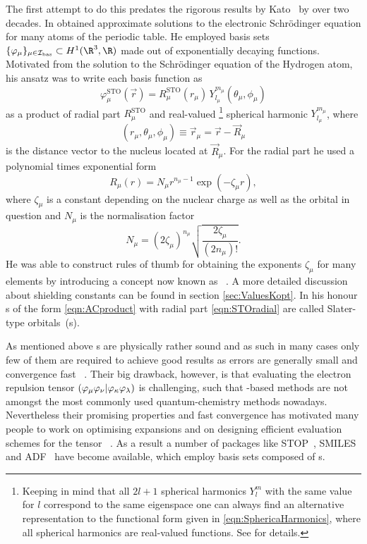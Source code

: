 The first attempt to do this predates the rigorous results by Kato~\cite{Kato1951,Kato1957}
by over two decades.
In \citeyear{Slater1930} \citet{Slater1930}
obtained approximate solutions to the electronic Schrödinger equation
for many atoms of the periodic table.
He employed basis sets $\{\varphi_\mu\}_{\mu\in\Ibas} \subset H^1(\R^3,\R)$
made out of exponentially decaying functions.
Motivated from the solution to the Schrödinger equation of the Hydrogen atom,
his ansatz was to write each basis function as
\begin{equation}
	\varphi^\text{STO}_\mu(\vec{r})
	= R^\text{STO}_\mu(r_\mu) \, Y_{l_\mu}^{m_\mu}(\theta_\mu, \phi_\mu)
	\label{eqn:ACproduct}
\end{equation}
\ie as a product of radial part $R^\text{STO}_\mu$
and real-valued%
\footnote{Keeping in mind that all $2l+1$ spherical harmonics
	$Y_l^m$ with the same value for $l$ correspond to the same eigenspace
	one can always find an alternative representation to the functional
	form given in \eqref{eqn:SphericaHarmonics},
	where all spherical harmonics are real-valued functions.
	See \cite{Avery2018} for details.
} spherical harmonic $Y_{l_\mu}^{m_\mu}$, where
\[ \left(r_\mu, \theta_\mu, \phi_\mu\right) \equiv \vec{r}_\mu = \vec{r} - \vec{R}_\mu \]
is the distance vector to the nucleus located at $\vec{R}_\mu$.
For the radial part he used a polynomial times exponential form
\begin{equation}
	R_\mu(r) = N_\mu r^{n_{\mu}-1} \exp(-\zeta_\mu r),
	\label{eqn:STOradial}
\end{equation}
where $\zeta_\mu$
is a constant depending on the nuclear charge as well as
the orbital in question and
$N_\mu$ is the normalisation factor
\[ N_\mu = \left( 2\zeta_\mu \right)^{n_\mu} \sqrt{\frac{2\zeta_\mu}{(2n_\mu)!}}. \]
He was able to construct rules of thumb for obtaining the exponents $\zeta_\mu$
for many elements by introducing
a concept now known as ~\cite{Slater1930}.
A more detailed discussion about shielding constants
can be found in section \vref{sec:ValuesKopt}.
In his honour {\ETO}s of the form \eqref{eqn:ACproduct}
with radial part \eqref{eqn:STOradial}
are called Slater-type orbitals~({\STO}s).

As mentioned above {\STO}s are physically rather sound
and as such in many cases only few of them are required to achieve good results
as errors are generally small and convergence fast%
~\cite{Shepard2007,Guell2008,Hoggan2009,Hoggan2011}.
Their big drawback, however,
is that evaluating the electron repulsion tensor
$\left( \varphi_\mu \varphi_\nu \middle| \varphi_\kappa \varphi_\lambda \right)$
is challenging,
such that \STO-based methods
are not amongst the most commonly used quantum-chemistry methods nowadays.
Nevertheless their promising properties and fast convergence
has motivated many people to work on optimising \STO expansions
and on designing efficient evaluation schemes for the \ERI tensor%
~\cite{Weniger1983,Hoggan2009,Hoggan2011,Avery2013,Avery2017}.
As a result a number of packages
like STOP~\cite{Bouferguene1996},
SMILES~\cite{FernandezRico2001}
and ADF~\cite{Velde2001}
have become available,
which employ basis sets composed of {\STO}s.
